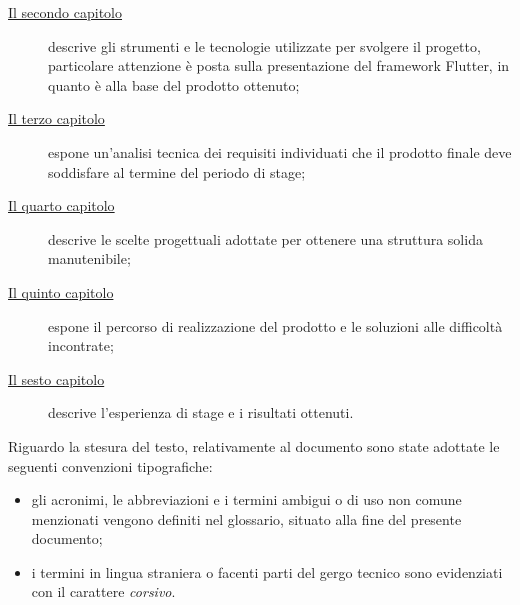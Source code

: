 \begin{description}
    \item[{\hyperref[cap:strumenti-utilizzati]{Il secondo capitolo}}] descrive gli strumenti e le tecnologie utilizzate per svolgere il progetto, particolare attenzione è posta sulla presentazione del framework Flutter, in quanto è alla base del prodotto ottenuto;
    
    \item[{\hyperref[cap:analisi-requisiti]{Il terzo capitolo}}] espone un'analisi tecnica dei requisiti individuati che il prodotto finale deve soddisfare al termine del periodo di stage;
    
    \item[{\hyperref[cap:progettazione]{Il quarto capitolo}}] descrive le scelte progettuali adottate per ottenere una struttura solida manutenibile;
    
    \item[{\hyperref[cap:sviluppo]{Il quinto capitolo}}] espone il percorso di realizzazione del prodotto e le soluzioni alle difficoltà incontrate;
    
    \item[{\hyperref[cap:conclusioni]{Il sesto capitolo}}] descrive l'esperienza di stage e i risultati ottenuti.
\end{description}

Riguardo la stesura del testo, relativamente al documento sono state adottate le seguenti convenzioni tipografiche:
\begin{itemize}
	\item gli acronimi, le abbreviazioni e i termini ambigui o di uso non comune menzionati vengono definiti nel glossario, situato alla fine del presente documento;
	\item i termini in lingua straniera o facenti parti del gergo tecnico sono evidenziati con il carattere \emph{corsivo}.
\end{itemize}
